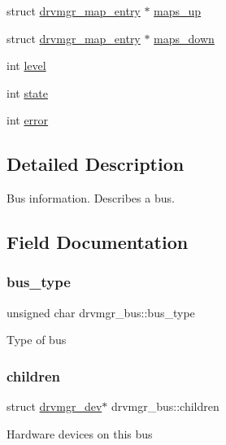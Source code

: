 \begin{DoxyCompactItemize}
struct \mbox{\hyperlink{structdrvmgr__map__entry}{drvmgr\+\_\+map\+\_\+entry}} $\ast$ \mbox{\hyperlink{structdrvmgr__bus_aa8a21e55bfae1ccaec41f20809d0f68d}{maps\+\_\+up}}
\item 
struct \mbox{\hyperlink{structdrvmgr__map__entry}{drvmgr\+\_\+map\+\_\+entry}} $\ast$ \mbox{\hyperlink{structdrvmgr__bus_a55f02fb830efad84b593618f042ca702}{maps\+\_\+down}}
\item 
int \mbox{\hyperlink{structdrvmgr__bus_aac06ed42936fd2af9086e200fa2ec86d}{level}}
\item 
int \mbox{\hyperlink{structdrvmgr__bus_a1d32bbcc0a03fd1bdce9902125b1fec3}{state}}
\item 
int \mbox{\hyperlink{structdrvmgr__bus_a0c3cf01c0652fa8e31512571114a0863}{error}}
\end{DoxyCompactItemize}


\subsection{Detailed Description}
Bus information. Describes a bus. 

\subsection{Field Documentation}
\mbox{\label{structdrvmgr__bus_ad7ac15a0b977823ec8fe6b144f232724}} 
\subsubsection{\texorpdfstring{bus\_type}{bus\_type}}
{\footnotesize\ttfamily unsigned char drvmgr\+\_\+bus\+::bus\+\_\+type}

Type of bus \mbox{\label{structdrvmgr__bus_adf36f8ff74f0a0dc8bed44aab4812497}} 
\subsubsection{\texorpdfstring{children}{children}}
{\footnotesize\ttfamily struct \mbox{\hyperlink{structdrvmgr__dev}{drvmgr\+\_\+dev}}$\ast$ drvmgr\+\_\+bus\+::children}

Hardware devices on this bus \mbox{\label{structdrvmgr__bus_a78774b30ceb29cc8b4aa16a7f2352eb4}} 
